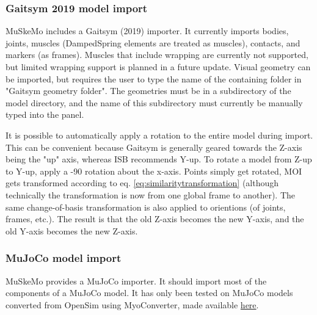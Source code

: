 \documentclass{article}
\begin{document}
\subsubsection{Gaitsym 2019 model import}

MuSkeMo includes a Gaitsym (2019) importer. It currently imports bodies, joints, muscles (DampedSpring elements are treated as muscles), contacts, and markers (as frames). Muscles that include wrapping are currently not supported, but limited wrapping support is planned in a future update. Visual geometry can be imported, but requires the user to type the name of the containing folder in "Gaitsym geometry folder". The geometries must be in a subdirectory of the model directory, and the name of this subdirectory must currently be manually typed into the panel.

It is possible to automatically apply a rotation to the entire model during import. This can be convenient because Gaitsym is generally geared towards the Z-axis being the "up" axis, whereas ISB recommends Y-up. To rotate a model from Z-up to Y-up, apply a -90 \degree rotation about the x-axis. Points simply get rotated, MOI gets transformed according to eq. \ref{eq:similaritytransformation} (although technically the transformation is now from one global frame to another). The same change-of-basis transformation is also applied to orientions (of joints, frames, etc.). The result is that the old Z-axis becomes the new Y-axis, and the old Y-axis becomes the new Z-axis.

\subsubsection{MuJoCo model import}
\label{sec:mujocoimporter}
MuSkeMo provides a MuJoCo importer. It should import most of the components of a MuJoCo model. It has only been tested on MuJoCo models converted from OpenSim using MyoConverter, made available \href{https://github.com/MyoHub/myoconverter/tree/main}{here}.
\end{document}
